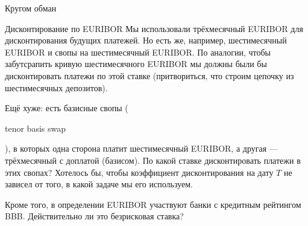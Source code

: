 \documentclass{beamer}
\newcommand{\en}[1]{\begin{otherlanguage}{english}#1\end{otherlanguage}}
\begin{document}



\begin{frame}{Кругом обман}
\centering
{}
\end{frame}



\begin{frame}{Дисконтирование по EURIBOR}
\justify
Мы использовали трёхмесячный EURIBOR для дисконтирования будущих платежей. Но есть же, например, шестимесячный EURIBOR и свопы на шестимесячный EURIBOR. По аналогии, чтобы забутсрапить кривую шестимесячного EURIBOR мы должны были бы дисконтировать платежи по этой ставке (притвориться, что строим цепочку из шестимесячных депозитов).

\justify
Ещё хуже: есть базисные свопы (\en{tenor basis swap}), в которых одна сторона платит шестимесячный EURIBOR, а другая --- трёхмесячный с доплатой (базисом). По какой ставке  дисконтировать платежи в этих свопах? Хотелось бы, чтобы коэффициент дисконтирования на дату $T$ не зависел от того, в какой задаче мы его используем.

\justify
Кроме того, в определении EURIBOR участвуют банки с кредитным рейтингом BBB. Действительно ли это безрисковая ставка?
\end{frame}
\end{document}
